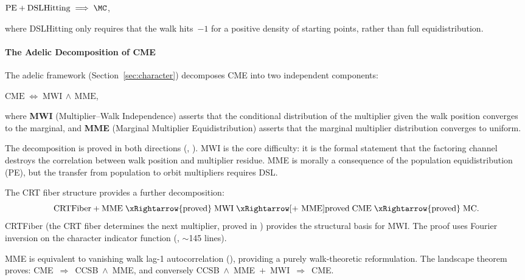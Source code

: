 \begin{theorem}
$\mathrm{PE} + \mathrm{DSLHitting} \;\Longrightarrow\; \MC$,
\end{theorem}

\noindent where DSLHitting only requires that the walk hits~$-1$ for a
positive density of starting points, rather than full equidistribution.

\paragraph{The Adelic Decomposition of CME}

The adelic framework (Section~\ref{sec:character}) decomposes CME into
two independent components:

\begin{theorem}
$\mathrm{CME} \;\Longleftrightarrow\; \mathrm{MWI} \,\wedge\, \mathrm{MME}$,
\end{theorem}

\noindent where \textbf{MWI} (Multiplier--Walk Independence) asserts
that the conditional distribution of the multiplier given the walk
position converges to the marginal, and \textbf{MME} (Marginal Multiplier
Equidistribution) asserts that the marginal multiplier distribution
converges to uniform.

The decomposition is proved in both directions
(, ).
MWI is the core difficulty: it is the formal statement that the
factoring channel destroys the correlation between walk position and
multiplier residue.  MME is morally a consequence of the population
equidistribution (PE), but the transfer from population to orbit
multipliers requires DSL\@.

\noindent The CRT fiber structure provides a further decomposition:
\[
\mathrm{CRTFiber} + \mathrm{MME}
\;\xRightarrow{\text{proved}}\;
\mathrm{MWI}
\;\xRightarrow[\text{+ MME}]{\text{proved}}\;
\mathrm{CME}
\;\xRightarrow{\text{proved}}\;
\mathrm{MC}.
\]
CRTFiber (the CRT fiber determines the next multiplier, proved in
) provides the structural basis for MWI\@.
The proof uses Fourier inversion on the character indicator function
(, $\sim$145 lines).

MME is equivalent to vanishing walk lag-1 autocorrelation
(), providing a purely
walk-theoretic reformulation.  The landscape theorem
 proves: CME~$\Rightarrow$~CCSB~$\wedge$~MME,
and conversely CCSB~$\wedge$~MME~$+$~MWI~$\Rightarrow$~CME\@.

